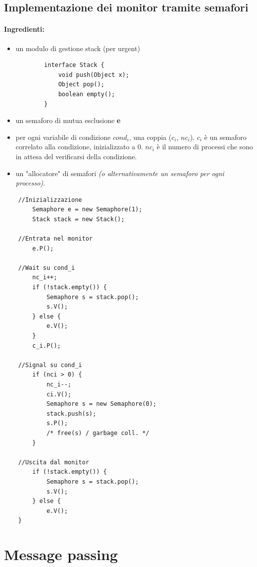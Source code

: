 \newpage

\subsection{Implementazione dei monitor tramite semafori}
\paragraph{Ingredienti:}
\begin{itemize}
    \item un modulo di gestione stack (per urgent)
    \begin{lstlisting}
        interface Stack {
            void push(Object x);
            Object pop();
            boolean empty();
        }
    \end{lstlisting}

    \item un semaforo di mutua esclusione \textbf{e}
    \item per ogni variabile di condizione $cond_i$, una coppia ($c_i$, $nc_i$).
    $c_i$ è un semaforo correlato alla condizione, inizializzato a 0. $nc_i$ è il numero di processi che sono in attesa del verificarsi della condizione.
    \item un "allocatore" di semafori \textit{(o alternativamente un semaforo per ogni processo)}.
\end{itemize}

\begin{lstlisting}
    //Inizializzazione
        Semaphore e = new Semaphore(1);
        Stack stack = new Stack();

    //Entrata nel monitor
        e.P();
    
    //Wait su cond_i
        nc_i++;
        if (!stack.empty()) {
            Semaphore s = stack.pop();
            s.V();
        } else {
            e.V();
        }
        c_i.P();

    //Signal su cond_i
        if (nci > 0) {
            nc_i--;
            ci.V();
            Semaphore s = new Semaphore(0);
            stack.push(s);
            s.P();
            /* free(s) / garbage coll. */
        }

    //Uscita dal monitor
        if (!stack.empty()) {
            Semaphore s = stack.pop();
            s.V();
        } else {
            e.V();
    }
\end{lstlisting}

\newpage
\section{Message passing}
